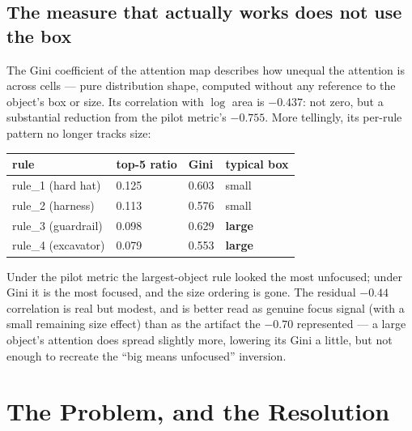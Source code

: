 \subsection{The measure that actually works does not use the box}

The Gini coefficient of the attention map describes how unequal the attention is across cells --- pure
distribution shape, computed without any reference to the object's box or size. Its correlation with
$\log$ area is $-0.437$: not zero, but a substantial reduction from the pilot metric's $-0.755$. More
tellingly, its per-rule pattern no longer tracks size:

\begin{center}
\begin{tabular}{p{3.2cm}p{2.6cm}p{2.6cm}p{2.8cm}}
\toprule
\textbf{rule} & \textbf{top-5 ratio} & \textbf{Gini} & \textbf{typical box} \\
\midrule
rule\_1 (hard hat)  & 0.125 & 0.603 & small \\
rule\_2 (harness)   & 0.113 & 0.576 & small \\
rule\_3 (guardrail) & 0.098 & 0.629 & \textbf{large} \\
rule\_4 (excavator) & 0.079 & 0.553 & \textbf{large} \\
\bottomrule
\end{tabular}
\label{tab:p22-perrule}
\end{center}

Under the pilot metric the largest-object rule looked the most unfocused; under Gini it is the most
focused, and the size ordering is gone. The residual $-0.44$ correlation is real but modest, and is
better read as genuine focus signal (with a small remaining size effect) than as the artifact the
$-0.70$ represented --- a large object's attention does spread slightly more, lowering its Gini a
little, but not enough to recreate the ``big means unfocused'' inversion.

\section{The Problem, and the Resolution}

